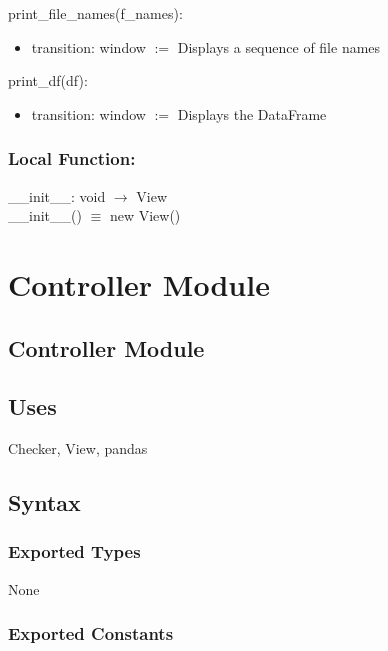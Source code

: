 \documentclass[12pt]{article}
\begin{document}

\noindent print\_file\_names(f\_names):
\begin{itemize}
\item transition: window $:=$ Displays a sequence of file names
\end{itemize}

\noindent print\_df(df):
\begin{itemize}
\item transition: window $:=$ Displays the DataFrame
\end{itemize}

\subsubsection*{Local Function:}

\_\_init\_\_: void $\rightarrow$ View \\
\_\_init\_\_() $\equiv$ new View()

\newpage

\section* {Controller Module}

\subsection* {Controller Module}

\subsection* {Uses}

Checker, View, pandas

\subsection* {Syntax}

\subsubsection* {Exported Types}

None

\subsubsection* {Exported Constants}
\end{document}
